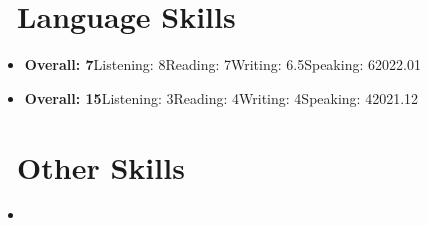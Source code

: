 \documentclass{resume}
\begin{document}
\section{\faLanguage\ Language Skills}
\begin{itemize}
  \item {}
  {\textbf{Overall: 7}}{Listening: 8}{Reading: 7}{Writing: 6.5}{Speaking: 6}{2022.01}

  \item {}
  {\textbf{Overall: 15}}{Listening: 3}{Reading: 4}{Writing: 4}{Speaking: 4}{2021.12}
\end{itemize}

\section{\faWrench\ Other Skills}
\begin{itemize}
  \item {}
\end{itemize}
\end{document}
